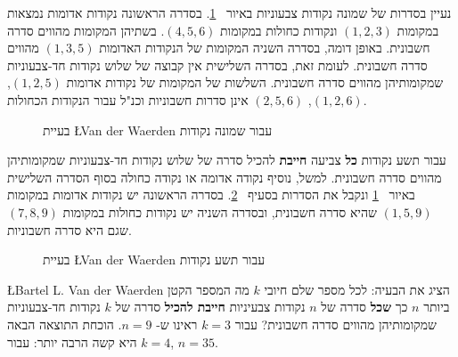 נעיין בסדרות של שמונה נקודות צבעוניות באיור%
~\ref{f.vdw1}.
בסדרה הראשונה נקודות אדומות נמצאות במקומות
$(1,2,3)$
ונקודות כחולות במקומות
$(4,5,6)$.
בשתיהן המקומות מהווים סדרה חשבונית. באופן דומה, בסדרה השניה המקומות של הנקודות האדומות
$(1,3,5)$
מהווים סדרה חשבונית. לעומת זאת, בסדרה השלישית אין קבוצה של שלוש נקודות חד-צבעוניות שמקומותיהן מהווים סדרה חשבונית. השלשות של המקומות של נקודות אדומות 
$(1,2,5)$, $(1,2,6)$, $(2,5,6)$
אינן סדרות חשבוניות וכנ"ל עבור הנקודות הכחולות.
\begin{figure}[htb]
\begin{center}
\end{center}
\caption{בעיית \L{Van der Waerden} עבור שמונה נקודות}\label{f.vdw1}
\end{figure}

עבור תשע נקודות
\textbf{כל}
צביעה
\textbf{חייבת}
להכיל סדרה של שלוש נקודות חד-צבעוניות שמקומותיהן מהווים סדרה חשבונית. למשל, נוסיף נקודה אדומה או נקודה כחולה בסוף הסדרה השלישית באיור%
~\ref{f.vdw1}
ונקבל את הסדרות בסעיף%
~\ref{f.vdw2}.
בסדרה הראשונה יש נקודות אדומות במקומות
$(1,5,9)$
שהיא סדרה חשבונית, ובסדרה השניה יש נקודות כחולות במקומות 
$(7,8,9)$
שגם היא סדרה חשבוניות.
\begin{figure}[htb]
\begin{center}
\end{center}
\caption{בעיית \L{Van der Waerden} עבור תשע נקודות}\label{f.vdw2}
\end{figure}

\L{Bartel L. Van der Waerden}
הציג את הבעיה:
לכל מספר שלם חיובי
$k$
מה המספר הקטן ביותר 
$n$
כך 
\textbf{שכל}
סדרה של 
$n$
נקודות צבעיניות
\textbf{חייבת להכיל}
סדרה של
$k$
נקודות חד-צבעוניות שמקומותיהן מהווים סדרה חשבונית? עבור
$k=3$
ראינו ש-%
$n=9$.
הוכחת התוצאה הבאה היא קשה הרבה יותר: עבור
$k=4$, $n=35$.

